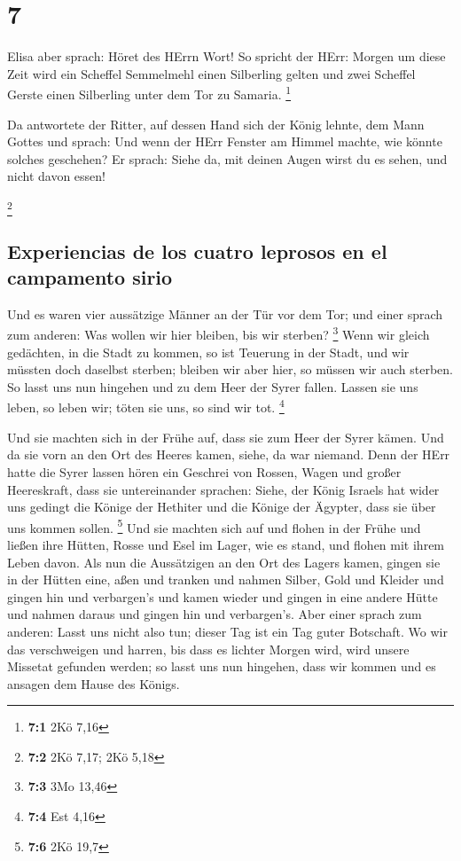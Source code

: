 \hypertarget{section-6}{%
\section{7}\label{section-6}}

 Elisa aber sprach: Höret des HErrn Wort! So spricht der
HErr: Morgen um diese Zeit wird ein Scheffel Semmelmehl einen Silberling
gelten und zwei Scheffel Gerste einen Silberling unter dem Tor zu
Samaria. \footnote{\textbf{7:1} 2Kö 7,16}

 Da antwortete der Ritter, auf dessen Hand sich der König
lehnte, dem Mann Gottes und sprach: Und wenn der HErr Fenster am Himmel
machte, wie könnte solches geschehen? Er sprach: Siehe da, mit deinen
Augen wirst du es sehen, und nicht davon essen!

\footnote{\textbf{7:2} 2Kö 7,17; 2Kö 5,18}

\hypertarget{experiencias-de-los-cuatro-leprosos-en-el-campamento-sirio}{%
\subsection{Experiencias de los cuatro leprosos en el campamento
sirio}\label{experiencias-de-los-cuatro-leprosos-en-el-campamento-sirio}}

 Und es waren vier aussätzige Männer an der Tür vor dem
Tor; und einer sprach zum anderen: Was wollen wir hier bleiben, bis wir
sterben? \footnote{\textbf{7:3} 3Mo 13,46}  Wenn wir
gleich gedächten, in die Stadt zu kommen, so ist Teuerung in der Stadt,
und wir müssten doch daselbst sterben; bleiben wir aber hier, so müssen
wir auch sterben. So lasst uns nun hingehen und zu dem Heer der Syrer
fallen. Lassen sie uns leben, so leben wir; töten sie uns, so sind wir
tot. \footnote{\textbf{7:4} Est 4,16}

 Und sie machten sich in der Frühe auf, dass sie zum Heer
der Syrer kämen. Und da sie vorn an den Ort des Heeres kamen, siehe, da
war niemand.  Denn der HErr hatte die Syrer lassen hören
ein Geschrei von Rossen, Wagen und großer Heereskraft, dass sie
untereinander sprachen: Siehe, der König Israels hat wider uns gedingt
die Könige der Hethiter und die Könige der Ägypter, dass sie über uns
kommen sollen. \footnote{\textbf{7:6} 2Kö 19,7}  Und sie
machten sich auf und flohen in der Frühe und ließen ihre Hütten, Rosse
und Esel im Lager, wie es stand, und flohen mit ihrem Leben davon.
 Als nun die Aussätzigen an den Ort des Lagers kamen,
gingen sie in der Hütten eine, aßen und tranken und nahmen Silber, Gold
und Kleider und gingen hin und verbargen's und kamen wieder und gingen
in eine andere Hütte und nahmen daraus und gingen hin und verbargen's.
 Aber einer sprach zum anderen: Lasst uns nicht also tun;
dieser Tag ist ein Tag guter Botschaft. Wo wir das verschweigen und
harren, bis dass es lichter Morgen wird, wird unsere Missetat gefunden
werden; so lasst uns nun hingehen, dass wir kommen und es ansagen dem
Hause des Königs.

